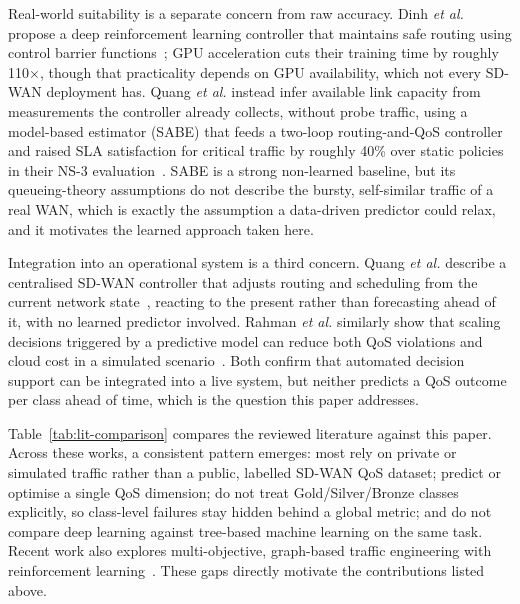 \documentclass[conference]{IEEEtran}
\begin{document}
Real-world suitability is a separate concern from raw accuracy. Dinh \emph{et al.} propose a deep reinforcement learning controller that maintains safe routing using control barrier functions~\cite{dinh2024safeloadbalancing}; GPU acceleration cuts their training time by roughly 110$\times$, though that practicality depends on GPU availability, which not every SD-WAN deployment has. Quang \emph{et al.} instead infer available link capacity from measurements the controller already collects, without probe traffic, using a model-based estimator (SABE) that feeds a two-loop routing-and-QoS controller and raised SLA satisfaction for critical traffic by roughly 40\% over static policies in their NS-3 evaluation~\cite{quang2023globalqos}. SABE is a strong non-learned baseline, but its queueing-theory assumptions do not describe the bursty, self-similar traffic of a real WAN, which is exactly the assumption a data-driven predictor could relax, and it motivates the learned approach taken here.

Integration into an operational system is a third concern. Quang \emph{et al.} describe a centralised SD-WAN controller that adjusts routing and scheduling from the current network state~\cite{quang2022routing}, reacting to the present rather than forecasting ahead of it, with no learned predictor involved. Rahman \emph{et al.} similarly show that scaling decisions triggered by a predictive model can reduce both QoS violations and cloud cost in a simulated scenario~\cite{rahman2019autoscaling}. Both confirm that automated decision support can be integrated into a live system, but neither predicts a QoS outcome per class ahead of time, which is the question this paper addresses.

Table~\ref{tab:lit-comparison} compares the reviewed literature against this paper. Across these works, a consistent pattern emerges: most rely on private or simulated traffic rather than a public, labelled SD-WAN QoS dataset; predict or optimise a single QoS dimension; do not treat Gold/Silver/Bronze classes explicitly, so class-level failures stay hidden behind a global metric; and do not compare deep learning against tree-based machine learning on the same task. Recent work also explores multi-objective, graph-based traffic engineering with reinforcement learning~\cite{chen2025mteal}. These gaps directly motivate the contributions listed above.
\end{document}
